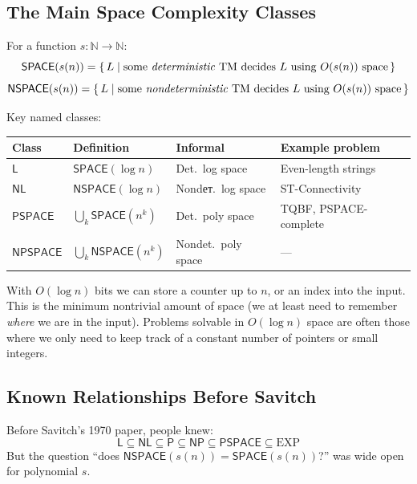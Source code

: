 \documentclass[12pt,a4paper]{article}
\theoremstyle{plain}
\theoremstyle{definition}
\theoremstyle{remark}
\newcommand{\SPACE}{\mathsf{SPACE}}
\newcommand{\NSPACE}{\mathsf{NSPACE}}
\newcommand{\PSPACE}{\mathsf{PSPACE}}
\newcommand{\NPSPACE}{\mathsf{NPSPACE}}
\newcommand{\NL}{\mathsf{NL}}
\newcommand{\LL}{\mathsf{L}}
\newcommand{\NP}{\mathsf{NP}}
\newcommand{\PP}{\mathsf{P}}
\begin{document}
\subsection{The Main Space Complexity Classes}

\begin{definitionbox}
For a function $s : \mathbb{N} \to \mathbb{N}$:
\[
  \SPACE(s(n)) = \{\,L \mid \text{some \emph{deterministic} TM decides } L \text{ using } O(s(n)) \text{ space}\,\}
\]
\[
  \NSPACE(s(n)) = \{\,L \mid \text{some \emph{nondeterministic} TM decides } L \text{ using } O(s(n)) \text{ space}\,\}
\]

\medskip
Key named classes:
\begin{center}
\renewcommand{\arraystretch}{1.4}
\begin{tabular}{llll}
\toprule
\textbf{Class} & \textbf{Definition} & \textbf{Informal} & \textbf{Example problem}\\
\midrule
$\LL$      & $\SPACE(\log n)$      & Det.\ log space   & Even-length strings \\
$\NL$      & $\NSPACE(\log n)$     & Nondет.\ log space & ST-Connectivity\\
$\PSPACE$  & $\bigcup_k \SPACE(n^k)$ & Det.\ poly space & TQBF, PSPACE-complete\\
$\NPSPACE$ & $\bigcup_k \NSPACE(n^k)$ & Nondet.\ poly space & ---\\
\bottomrule
\end{tabular}
\end{center}
\end{definitionbox}

\begin{intuitionbox}
With $O(\log n)$ bits we can store a counter up to $n$, or an index into the input. This is the minimum nontrivial amount of space (we at least need to remember \emph{where} we are in the input). Problems solvable in $O(\log n)$ space are often those where we only need to keep track of a constant number of pointers or small integers.
\end{intuitionbox}

\subsection{Known Relationships Before Savitch}

Before Savitch's 1970 paper, people knew:
\[
  \LL \subseteq \NL \subseteq \PP \subseteq \NP \subseteq \PSPACE \subseteq \text{EXP}
\]
But the question ``does $\NSPACE(s(n)) = \SPACE(s(n))$?'' was wide open for polynomial $s$.
\end{document}
